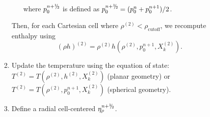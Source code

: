 \documentclass{aastex62}
\newcommand{\sfrac}[2]{\mathchoice
  {\kern0em\raise.5ex\hbox{\the\scriptfont0 #1}\kern-.15em/
   \kern-.15em\lower.25ex\hbox{\the\scriptfont0 #2}}
  {\kern0em\raise.5ex\hbox{\the\scriptfont0 #1}\kern-.15em/
   \kern-.15em\lower.25ex\hbox{\the\scriptfont0 #2}}
  {\kern0em\raise.5ex\hbox{\the\scriptscriptfont0 #1}\kern-.2em/
   \kern-.15em\lower.25ex\hbox{\the\scriptscriptfont0 #2}}
  {#1\!/#2}}
\newcommand{\myhalf}{\sfrac{1}{2}}
\newcommand{\eb}{{\bf{e}}}
\newcommand{\Ub}{{\bf{U}}}
\newcommand{\dt}{\Delta t}
\newcommand{\etarho}{\eta_\rho}
\newcommand{\pred}{{\rm pred}}
\newcommand{\nph}{{n+\myhalf}}
\newcommand{\uadvtwo}{\Ub^{\mathrm{ADV}}}
\begin{document}
\begin{description}
\begin{enumerate}
\begin{enumerate}
where $p_0^\nph$ is defined as $p_0^\nph = (p_0^n+p_0^{n+1})/2$.

\end{enumerate}

Then, for each Cartesian cell where $\rho^{(2)} < \rho_\mathrm{cutoff}$, we recompute enthalpy using
\begin{equation}
(\rho h)^{(2)} = \rho^{(2)}h\left(\rho^{(2)},p_0^{n+1},X_k^{(2)}\right).
\end{equation}

\item Update the temperature using the equation of state:
$T^{(2)} =
   T(\rho^{(2)}, h^{(2)}, X_k^{(2)})$ (planar geometry) or
$T^{(2)} =
   T(\rho^{(2)}, p_0^{n+1}, X_k^{(2)})$ (spherical geometry).

\item Define a radial cell-centered $\etarho^{\nph}$.




\end{enumerate}
\end{description}
\end{document}

